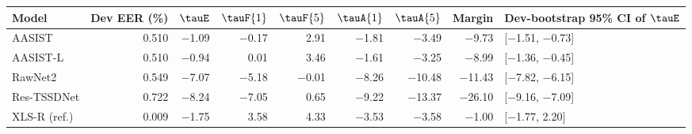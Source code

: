\begin{tabular}{@{}lrrrrrrrl@{}}
\toprule
Model & Dev EER (\%) & $\tauE$ & $\tauF{1}$ & $\tauF{5}$ & $\tauA{1}$ & $\tauA{5}$ & Margin & Dev-bootstrap 95\% CI of $\tauE$ \\
\midrule
AASIST & 0.510 & $-$1.09 & $-$0.17 & 2.91 & $-$1.81 & $-$3.49 & $-$9.73 & [$-$1.51, $-$0.73] \\
AASIST-L & 0.510 & $-$0.94 & 0.01 & 3.46 & $-$1.61 & $-$3.25 & $-$8.99 & [$-$1.36, $-$0.45] \\
RawNet2 & 0.549 & $-$7.07 & $-$5.18 & $-$0.01 & $-$8.26 & $-$10.48 & $-$11.43 & [$-$7.82, $-$6.15] \\
Res-TSSDNet & 0.722 & $-$8.24 & $-$7.05 & 0.65 & $-$9.22 & $-$13.37 & $-$26.10 & [$-$9.16, $-$7.09] \\
XLS-R (ref.) & 0.009 & $-$1.75 & 3.58 & 4.33 & $-$3.53 & $-$3.58 & $-$1.00 & [$-$1.77, 2.20] \\
\bottomrule
\end{tabular}

